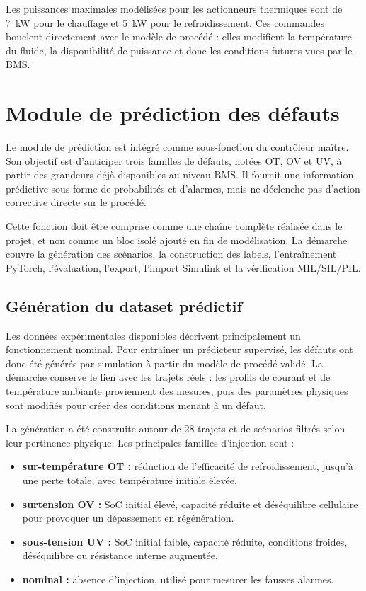 \noindent
Les puissances maximales modélisées pour les actionneurs thermiques sont de 7~kW pour le chauffage et 5~kW pour le refroidissement. Ces commandes bouclent directement avec le modèle de procédé : elles modifient la température du fluide, la disponibilité de puissance et donc les conditions futures vues par le BMS.

\section{Module de prédiction des défauts}
\label{sec:ch4_prediction_defauts}

Le module de prédiction est intégré comme sous-fonction du contrôleur maître. Son objectif est d'anticiper trois familles de défauts, notées OT, OV et UV, à partir des grandeurs déjà disponibles au niveau BMS. Il fournit une information prédictive sous forme de probabilités et d'alarmes, mais ne déclenche pas d'action corrective directe sur le procédé.

\noindent
Cette fonction doit être comprise comme une chaîne complète réalisée dans le projet, et non comme un bloc isolé ajouté en fin de modélisation. La démarche couvre la génération des scénarios, la construction des labels, l'entraînement PyTorch, l'évaluation, l'export, l'import Simulink et la vérification MIL/SIL/PIL.

\subsection{Génération du dataset prédictif}
\label{subsec:ch4_donnees_prediction}

Les données expérimentales disponibles décrivent principalement un fonctionnement nominal. Pour entraîner un prédicteur supervisé, les défauts ont donc été générés par simulation à partir du modèle de procédé validé. La démarche conserve le lien avec les trajets réels : les profils de courant et de température ambiante proviennent des mesures, puis des paramètres physiques sont modifiés pour créer des conditions menant à un défaut.

\noindent
La génération a été construite autour de 28 trajets et de scénarios filtrés selon leur pertinence physique. Les principales familles d'injection sont :
\begin{itemize}
  \item \textbf{sur-température OT :} réduction de l'efficacité de refroidissement, jusqu'à une perte totale, avec température initiale élevée.
  \item \textbf{surtension OV :} SoC initial élevé, capacité réduite et déséquilibre cellulaire pour provoquer un dépassement en régénération.
  \item \textbf{sous-tension UV :} SoC initial faible, capacité réduite, conditions froides, déséquilibre ou résistance interne augmentée.
  \item \textbf{nominal :} absence d'injection, utilisé pour mesurer les fausses alarmes.
\end{itemize}

